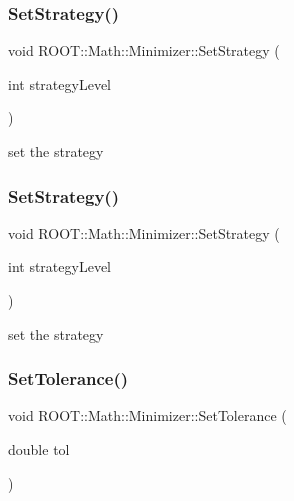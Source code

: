 \subsubsection{\texorpdfstring{SetStrategy()}{SetStrategy()}\hspace{0.1cm}{\footnotesize\ttfamily [1/2]}}
{\footnotesize\ttfamily void R\+O\+O\+T\+::\+Math\+::\+Minimizer\+::\+Set\+Strategy (\begin{DoxyParamCaption}\item[{int}]{strategy\+Level }\end{DoxyParamCaption})\hspace{0.3cm}{\ttfamily [inline]}}



set the strategy 

\mbox{\label{classROOT_1_1Math_1_1Minimizer_a86a1145e00a7912ac061bad0e11b6c0b}} 
\subsubsection{\texorpdfstring{SetStrategy()}{SetStrategy()}\hspace{0.1cm}{\footnotesize\ttfamily [2/2]}}
{\footnotesize\ttfamily void R\+O\+O\+T\+::\+Math\+::\+Minimizer\+::\+Set\+Strategy (\begin{DoxyParamCaption}\item[{int}]{strategy\+Level }\end{DoxyParamCaption})\hspace{0.3cm}{\ttfamily [inline]}}



set the strategy 

\mbox{\label{classROOT_1_1Math_1_1Minimizer_a5b7ee47a24b2412801654b8cde2c9b4f}} 
\subsubsection{\texorpdfstring{SetTolerance()}{SetTolerance()}\hspace{0.1cm}{\footnotesize\ttfamily [1/2]}}
{\footnotesize\ttfamily void R\+O\+O\+T\+::\+Math\+::\+Minimizer\+::\+Set\+Tolerance (\begin{DoxyParamCaption}\item[{double}]{tol }\end{DoxyParamCaption})\hspace{0.3cm}{\ttfamily [inline]}}



